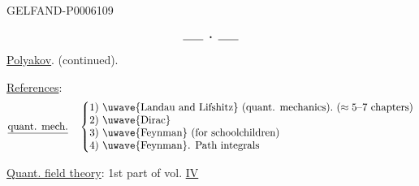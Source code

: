 \begin{GelfandAdjacentEvidence}{GELFAND-P000610}{9}

\[\rule{1.8em}{.4pt}\;\boldsymbol{\cdot}\;\rule{1.8em}{.4pt}\]
\underline{\underline{Polyakov}}. (continued).

\underline{References}:
\[
\text{\underline{quant. mech.}}\quad\left\{\begin{array}{@{}l@{}}
\text{1) \uwave{Landau and Lifshitz} (quant. mechanics).}\ (\approx5\text{–}7\ \text{chapters})\\
\text{2) \uwave{Dirac}}\\
\text{3) \uwave{Feynman} (for schoolchildren)}\\
\text{4) \uwave{Feynman}. Path integrals}
\end{array}\right.
\]
\end{GelfandAdjacentEvidence}


\underline{Quant. field theory}: 1st part of vol. \underline{IV}\quad{}


